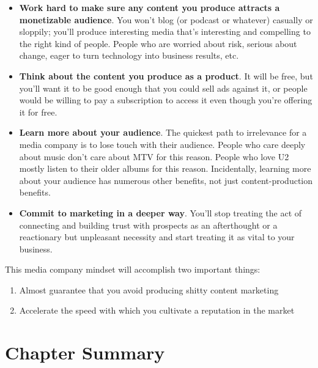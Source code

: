 \begin{itemize}
\item \textbf{Work hard to make sure any content you produce attracts a monetizable audience}. You won’t blog (or podcast or whatever) casually or sloppily; you’ll produce interesting media that’s interesting and compelling to the right kind of people. People who are worried about risk, serious about change, eager to turn technology into business results, etc.
\item \textbf{Think about the content you produce as a product}. It will be free, but you’ll want it to be good enough that you could sell ads against it, or people would be willing to pay a subscription to access it even though you’re offering it for free.
\item \textbf{Learn more about your audience}. The quickest path to irrelevance for a media company is to lose touch with their audience. People who care deeply about music don’t care about MTV for this reason. People who love U2 mostly listen to their older albums for this reason. Incidentally, learning more about your audience has numerous other benefits, not just content-production benefits.
\item \textbf{Commit to marketing in a deeper way}. You’ll stop treating the act of connecting and building trust with prospects as an afterthought or a reactionary but unpleasant necessity and start treating it as vital to your business.
\end{itemize}

This media company mindset will accomplish two important things:

\begin{enumerate}
\item Almost guarantee that you avoid producing shitty content marketing
\item Accelerate the speed with which you cultivate a reputation in the market
\end{enumerate}

\section{Chapter Summary}